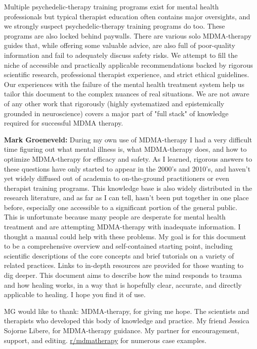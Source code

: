 \documentclass[12pt,letterpaper]{book}
\begin{document}
Multiple psychedelic-therapy training programs exist for mental health professionals but typical therapist education often contains major oversights, and we strongly suspect psychedelic-therapy training programs do too. These programs are also locked behind paywalls. There are various solo MDMA-therapy guides that, while offering some valuable advice, are also full of poor-quality information and fail to adequately discuss safety risks. We attempt to fill the niche of accessible and practically applicable recommendations backed by rigorous scientific research, professional therapist experience, and strict ethical guidelines. Our experiences with the failure of the mental health treatment system help us tailor this document to the complex nuances of real situations. We are not aware of any other work that rigorously (highly systematized and epistemically grounded in neuroscience) covers a major part of "full stack" of knowledge required for successful MDMA therapy.

\textbf{Mark Groeneveld:} During my own use of MDMA-therapy I had a very difficult time figuring out what mental illness is, what MDMA-therapy does, and how to optimize MDMA-therapy for efficacy and safety. As I learned, rigorous answers to these questions have only started to appear in the 2000's and 2010's, and haven't yet widely diffused out of academia to on-the-ground practitioners or even therapist training programs. This knowledge base is also widely distributed in the research literature, and as far as I can tell, hasn't been put together in one place before, especially one accessible to a significant portion of the general public. This is unfortunate because many people are desperate for mental health treatment and are attempting MDMA-therapy with inadequate information. I thought a manual could help with these problems. My goal is for this document to be a comprehensive overview and self-contained starting point, including scientific descriptions of the core concepts and brief tutorials on a variety of related practices. Links to in-depth resources are provided for those wanting to dig deeper. This document aims to describe how the mind responds to trauma and how healing works, in a way that is hopefully clear, accurate, and directly applicable to healing. I hope you find it of use.

MG would like to thank: MDMA-therapy, for giving me hope. The scientists and therapists who developed this body of knowledge and practice. My friend Jessica Sojorne Libere, for MDMA-therapy guidance. My partner for encouragement, support, and editing. \href{https://www.reddit.com/r/mdmatherapy}{r/mdmatherapy} for numerous case examples.
\end{document}
